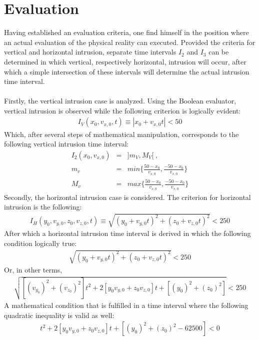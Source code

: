 \documentclass{article}
\begin{document}
\section*{Evaluation}
Having established an evaluation criteria, one find himself in the position where an actual evaluation of the physical reality can executed. Provided the criteria for vertical and horizontal intrusion, separate time intervals $I_2$ and $I_3$ can be determined in which vertical, respectively horizontal, intrusion will occur, after which a simple intersection of these intervals will determine the actual intrusion time interval.\\
\\
Firstly, the vertical intrusion case is analyzed. Using the Boolean evaluator, vertical intrusion is observed while the following criterion is logically evident:
\begin{eqnarray*}
I_V(x_0,v_{x,0},t) \equiv |x_0 +v_{x,0}t|<50
\end{eqnarray*}
Which, after several steps of mathematical manipulation, corresponds to the following vertical intrusion time interval:
\begin{eqnarray*}
I_2(x_0,v_{x,0}) &=& ]m_V,M_V[ \ , \\
m_v &=& min\{\frac{50-x_0}{v_{x,0}},\frac{-50-x_0}{v_{x,0}}\} \\
M_v &=& max\{\frac{50-x_0}{v_{x,0}},\frac{-50-x_0}{v_{x,0}}\}
\end{eqnarray*}
\noindent
Secondly, the horizontal intrusion case is considered. The criterion for horizontal intrusion is the following:
\begin{eqnarray*}
I_H(y_0,v_{y,0},z_0,v_{z,0},t) \equiv \sqrt{(y_0 +v_{y,0}t)^2+(z_0 +v_{z,0}t)^2}<250
\end{eqnarray*}
After which a horizontal intrusion time interval is derived in which
the following condition logically true:
\begin{eqnarray*}
\sqrt{(y_0 +v_{y,0}t)^2+(z_0+v_{z,0}t)^2}<250
\end{eqnarray*}
Or, in other terms,
\begin{eqnarray*}
\sqrt{[(v_{y_0})^2+(v_{z_0})^2]t^2+2[y_0v_{y,0}+z_0 v_{z,0}]t+[(y_0)^2 +(z_0)^2]}<250
\end{eqnarray*}
A mathematical condition that is fulfilled in a time interval where the following quadratic inequality is valid as well: 
\begin{eqnarray*}
[(v_{y_0})^2+(v_{z_0})^2]t^2+2[y_0v_{y,0}+z_0 v_{z,0}]t+[(y_0)^2 +(z_0)^2-62500]<0
\end{eqnarray*}
\end{document}
